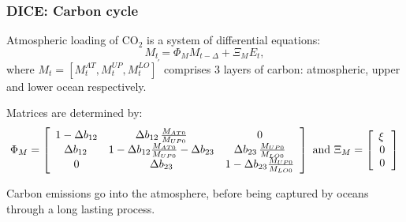 \documentclass[xcolor=x11names,compress,aspectratio=169]{beamer}%
\makeatletter
\renewenvironment{itemize}{\begin{compactitemize}[<+-| alert@+>]}{\end{compactitemize}}
\makeatother
\begin{document}
\begin{frame}%
%

\frametitle{DICE: Carbon cycle}%


\begin{itemize}
\item Atmospheric loading of CO$_{2}$ is a system of differential equations:
\begin{equation}
M_{t}=\Phi_{M}M_{t-\Delta}+\Xi_{M}E_{t},\label{eq:carbon LOM}%
\end{equation}
where $M_{t}=[M_{t}^{AT},M_{t}^{UP},M_{t}^{LO}]^{\prime}$ comprises 3 layers
of carbon: atmospheric, upper and lower ocean respectively.%
\vspace{3ex}%


\item Matrices are determined by:%
\[
\Phi_{M}=\left[
\begin{array}
[c]{ccc}%
1-\Delta b_{12} & \Delta b_{12}\,\frac{M_{AT0}}{M_{UP0}} & 0\\
\Delta b_{12}\, & 1-\Delta b_{12}\tfrac{M_{AT0}}{M_{UP0}}-\Delta b_{23} &
\Delta b_{23}\,\frac{M_{UP0}}{M_{LO0}}\\
0 & \Delta b_{23} & 1-\Delta b_{23}\tfrac{M_{UP0}}{M_{LO0}}%
\end{array}
\right]  \text{ and }\Xi_{M}=\left[
\begin{array}
[c]{c}%
\xi\,\\
0\\
0
\end{array}
\right]
\]%
\vspace{2ex}%


\item Carbon emissions go into the atmosphere, before being captured by oceans
through a long lasting process.
\end{itemize}

%

\transboxout
\end{frame}%
%
\end{document}
